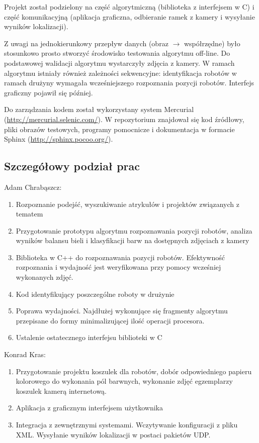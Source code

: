 \documentclass[polish,12pt]{aghthesis}
\begin{document}
Projekt został podzielony na część algorytmiczną (biblioteka z interfejsem w C)
i część komunikacyjną (aplikacja graficzna, odbieranie ramek z kamery i
wysyłanie wyników lokalizacji).

Z uwagi na jednokierunkowy przepływ danych (obraz $\to$ współrzędne) było 
stosunkowo prosto stworzyć środowisko testowania algorytmu off-line. Do 
podstawowej walidacji algorytmu wystarczyły zdjęcia z kamery. W ramach 
algorytmu istniały również zależności 
sekwencyjne: identyfikacja robotów w ramach drużyny wymagała wcześniejszego 
rozpoznania pozycji robotów. Interfejs graficzny pojawił się później. 

Do zarządzania kodem został wykorzystany system Mercurial
(\url{http://mercurial.selenic.com/}). 
W repozytorium znajdował się kod źródłowy, pliki obrazów testowych, programy
pomocnicze i dokumentacja w formacie Sphinx (\url{http://sphinx.pocoo.org/}).

\subsection{Szczegółowy podział prac}
Adam Chrabąszcz:
\begin{enumerate}
\item Rozpoznanie podejść, wyszukiwanie atrykułów i projektów związanych z
tematem
\item Przygotowanie prototypu algorytmu rozpoznawania pozycji robotów,
analiza wyników balansu bieli i klasyfikacji barw na dostępnych zdjęciach z
kamery
\item Biblioteka w C++ do rozpoznawania pozycji robotów. Efektywność
rozpoznania i wydajność jest weryfikowana przy pomocy wcześniej wykonanych 
zdjęć.
\item Kod identyfikujący poszczególne roboty w drużynie
\item Poprawa wydajności. Najdłużej wykonujące się fragmenty algorytmu 
przepisane do formy minimalizującej ilość operacji procesora.
\item Ustalenie ostatecznego interfejsu biblioteki w C
\end{enumerate}
Konrad Kras:
\begin{enumerate}
\item Przygotowanie projektu koszulek dla robotów, dobór odpowiedniego papieru
kolorowego do wykonania pól barwnych, wykonanie zdjęć egzemplarzy koszulek
kamerą internetową.
\item Aplikacja z graficznym interfejsem użytkownika
\item Integracja z zewnętrznymi systemami. Wczytywanie konfiguracji z pliku XML.
Wysyłanie wyników lokalizacji w postaci pakietów UDP.
\end{enumerate}
\end{document}
